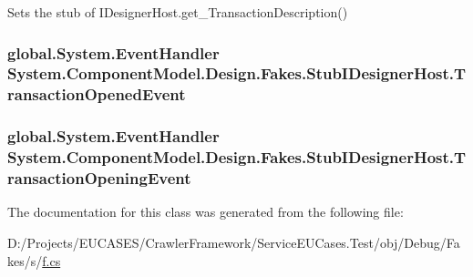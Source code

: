Sets the stub of I\-Designer\-Host.\-get\-\_\-\-Transaction\-Description()

\hypertarget{class_system_1_1_component_model_1_1_design_1_1_fakes_1_1_stub_i_designer_host_aaa7ac7d89d090e04f5c30ebab2332513}{
\subsubsection[{Transaction\-Opened\-Event}]{\setlength{\rightskip}{0pt plus 5cm}global.\-System.\-Event\-Handler System.\-Component\-Model.\-Design.\-Fakes.\-Stub\-I\-Designer\-Host.\-Transaction\-Opened\-Event}}\label{class_system_1_1_component_model_1_1_design_1_1_fakes_1_1_stub_i_designer_host_aaa7ac7d89d090e04f5c30ebab2332513}
\hypertarget{class_system_1_1_component_model_1_1_design_1_1_fakes_1_1_stub_i_designer_host_a16b0ada4e9919d0ba3ba1d0930adcd48}{
\subsubsection[{Transaction\-Opening\-Event}]{\setlength{\rightskip}{0pt plus 5cm}global.\-System.\-Event\-Handler System.\-Component\-Model.\-Design.\-Fakes.\-Stub\-I\-Designer\-Host.\-Transaction\-Opening\-Event}}\label{class_system_1_1_component_model_1_1_design_1_1_fakes_1_1_stub_i_designer_host_a16b0ada4e9919d0ba3ba1d0930adcd48}


The documentation for this class was generated from the following file\-:\begin{DoxyCompactItemize}
\item 
D\-:/\-Projects/\-E\-U\-C\-A\-S\-E\-S/\-Crawler\-Framework/\-Service\-E\-U\-Cases.\-Test/obj/\-Debug/\-Fakes/s/\hyperlink{s_2f_8cs}{f.\-cs}\end{DoxyCompactItemize}
